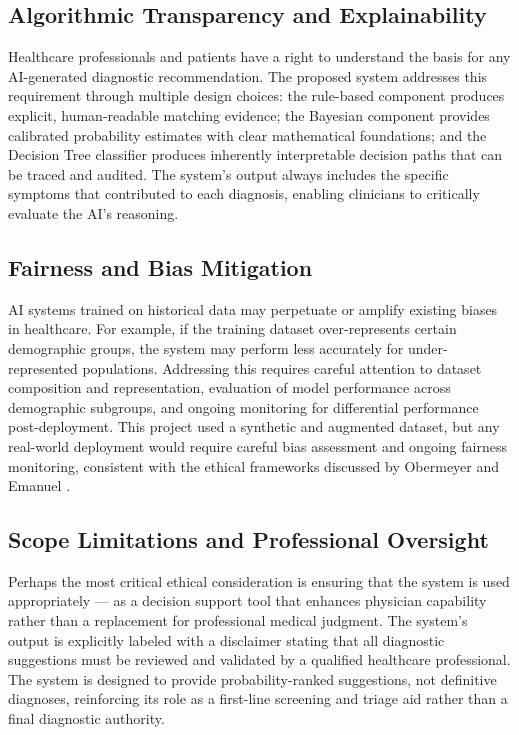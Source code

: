 \documentclass[12pt,a4paper]{article}
\begin{document}
\subsection{Algorithmic Transparency and Explainability}

Healthcare professionals and patients have a right to understand the basis for any AI-generated diagnostic recommendation. The proposed system addresses this requirement through multiple design choices: the rule-based component produces explicit, human-readable matching evidence; the Bayesian component provides calibrated probability estimates with clear mathematical foundations; and the Decision Tree classifier produces inherently interpretable decision paths that can be traced and audited. The system's output always includes the specific symptoms that contributed to each diagnosis, enabling clinicians to critically evaluate the AI's reasoning.

\subsection{Fairness and Bias Mitigation}

AI systems trained on historical data may perpetuate or amplify existing biases in healthcare. For example, if the training dataset over-represents certain demographic groups, the system may perform less accurately for under-represented populations. Addressing this requires careful attention to dataset composition and representation, evaluation of model performance across demographic subgroups, and ongoing monitoring for differential performance post-deployment. This project used a synthetic and augmented dataset, but any real-world deployment would require careful bias assessment and ongoing fairness monitoring, consistent with the ethical frameworks discussed by Obermeyer and Emanuel \cite{obermeyer}.

\subsection{Scope Limitations and Professional Oversight}

Perhaps the most critical ethical consideration is ensuring that the system is used appropriately --- as a decision support tool that enhances physician capability rather than a replacement for professional medical judgment. The system's output is explicitly labeled with a disclaimer stating that all diagnostic suggestions must be reviewed and validated by a qualified healthcare professional. The system is designed to provide probability-ranked suggestions, not definitive diagnoses, reinforcing its role as a first-line screening and triage aid rather than a final diagnostic authority.
\end{document}
